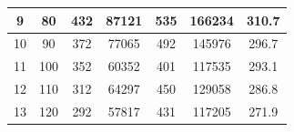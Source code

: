 \begin{table}[]
{\begin{tabular}{|c|c|c|c|c|c|c|}
{\color[HTML]{1B1C1D} 9}  & {\color[HTML]{1B1C1D} 80}  & {\color[HTML]{1B1C1D} 432} & {\color[HTML]{1B1C1D} 87121}  & {\color[HTML]{1B1C1D} 535} & {\color[HTML]{1B1C1D} 166234}  & {\color[HTML]{1B1C1D} 310.7}   \\ \hline
{\color[HTML]{1B1C1D} 10} & {\color[HTML]{1B1C1D} 90}  & {\color[HTML]{1B1C1D} 372} & {\color[HTML]{1B1C1D} 77065}  & {\color[HTML]{1B1C1D} 492} & {\color[HTML]{1B1C1D} 145976}  & {\color[HTML]{1B1C1D} 296.7}   \\ \hline
{\color[HTML]{1B1C1D} 11} & {\color[HTML]{1B1C1D} 100} & {\color[HTML]{1B1C1D} 352} & {\color[HTML]{1B1C1D} 60352}  & {\color[HTML]{1B1C1D} 401} & {\color[HTML]{1B1C1D} 117535}  & {\color[HTML]{1B1C1D} 293.1}   \\ \hline
{\color[HTML]{1B1C1D} 12} & {\color[HTML]{1B1C1D} 110} & {\color[HTML]{1B1C1D} 312} & {\color[HTML]{1B1C1D} 64297}  & {\color[HTML]{1B1C1D} 450} & {\color[HTML]{1B1C1D} 129058}  & {\color[HTML]{1B1C1D} 286.8}   \\ \hline
{\color[HTML]{1B1C1D} 13} & {\color[HTML]{1B1C1D} 120} & {\color[HTML]{1B1C1D} 292} & {\color[HTML]{1B1C1D} 57817}  & {\color[HTML]{1B1C1D} 431} & {\color[HTML]{1B1C1D} 117205}  & {\color[HTML]{1B1C1D} 271.9}   \\ \hline
\end{tabular}
}
\end{table}

